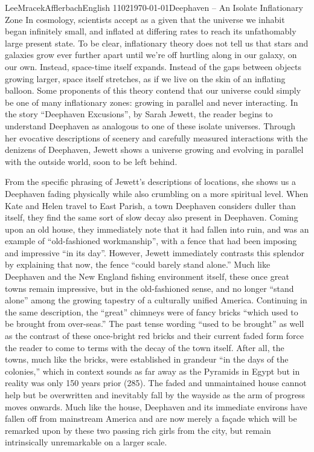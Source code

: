 \documentclass[12pt, letterpaper]{article}
\begin{document}
 \begin{mla}{Lee}{Mracek}{Afflerbach}{English
1102}{\today}{Deephaven -- An Isolate Inflationary Zone}
In cosmology, scientists accept as a given that the universe we inhabit began
infinitely small, and inflated at differing rates to reach its unfathomably
large present state. To be clear, inflationary theory does not tell us that
stars and galaxies grow ever further apart until we're off hurtling along in our
galaxy, on our own. Instead, space-time itself expands. Instead of the gaps
between objects growing larger, space itself stretches, as if we live on the
skin of an inflating balloon. Some proponents of this theory contend that our
universe could simply be one of many inflationary zones: growing in parallel and
never interacting. In the story ``Deephaven Excusions'', by Sarah Jewett,
the reader begins to understand Deephaven as analogous to one of these isolate
universes. Through her evocative descriptions of scenery and carefully measured
interactions with the denizens of Deephaven, Jewett shows a universe growing and
evolving in parallel with the outside world, soon to be left behind.

From the specific phrasing of Jewett's descriptions of locations, she shows us a
Deephaven fading physically while also crumbling on a more spiritual level.
When Kate and Helen travel to East Parish, a town Deephaven considers duller
than itself, they find the same sort of slow decay also present in Deephaven.
Coming upon an old house, they immediately note that it had fallen into ruin,
and was an example of ``old-fashioned workmanship'', with a fence that had been
imposing and impressive ``in its day''. However, Jewett immediately contrasts
this splendor by explaining that now, the fence ``could barely stand alone.''
Much like Deephaven and the New England fishing environment itself, these once
great towns remain impressive, but in the old-fashioned sense, and no longer
``stand alone'' among the growing tapestry of a culturally unified America.
Continuing in the same description, the ``great'' chimneys were of fancy bricks
``which used to be brought from over-seas.'' The past tense wording ``used to be
brought'' as well as the contrast of these once-bright red bricks and their
current faded form force the reader to come to terms with the decay of the town
itself. After all, the towns, much like the bricks, were established in grandeur
``in the days of the colonies,'' which in context sounds as far away as the
Pyramids in Egypt but in reality was only 150 years prior (285). The faded and
unmaintained house cannot help but be overwritten and inevitably fall by the
wayside as the arm of progress moves onwards.  Much like the house, Deephaven
and its immediate environs have fallen off from mainstream America and are now
merely a façade which will be remarked upon by these two passing rich girls from
the city, but remain intrinsically unremarkable on a larger scale.


\end{mla}
\end{document}
